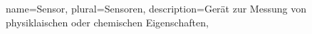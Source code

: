 \makenoidxglossaries
{}
{
	name=Sensor,
	plural=Sensoren,
	description={Gerät zur Messung von physiklaischen oder chemischen Eigenschaften},
}